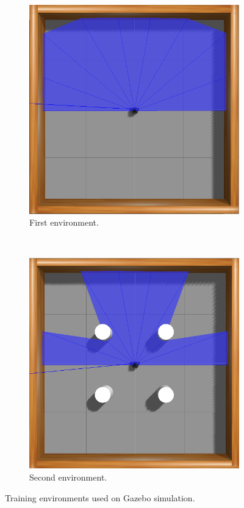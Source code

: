 \begin{figure}[htbp]
    \centering
    \begin{subfigure}[b]{0.2\textwidth}
        \includegraphics[width=\textwidth]{images/amb1.png}
        \caption{First environment.}
        \label{subfig:env1}
    \end{subfigure}
    ~ %
    \begin{subfigure}[b]{0.2\textwidth}
        \includegraphics[width=\textwidth]{images/amb2.png}
        \caption{Second environment.}
        \label{subfig:env2}
    \end{subfigure}
    \caption{Training environments used on Gazebo simulation.}\label{fig:environments}
\end{figure}

